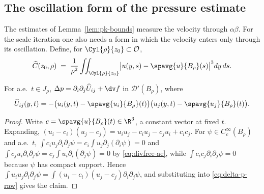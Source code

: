 \documentclass[11pt,reqno]{amsart}
\begin{document}
\subsection{The oscillation form of the pressure estimate}\label{ss:lin34}

The estimates of Lemma~\ref{lem:pk-bounds} measure the velocity through
$\alpha\beta$. For the scale iteration one also needs a form in which the
velocity enters only through its oscillation. Define, for
$\Cyl{\rho}{z_{0}}\subset\mathcal{O}$,
\begin{equation}\label{eq:Chat}
  \widehat C(z_{0},\rho)
  \;=\;\frac1{\rho^{2}}\iint_{\Cyl{\rho}{z_{0}}}
       \bigl|u(y,s)-\spavg{u}{B_{\rho}}(s)\bigr|^{3}dy\,ds .
\end{equation}

\begin{lemma}\label{lem:delta-p-centred}
For a.e.\ $t\in J_{\rho}$, $\Delta p=\partial_{i}\partial_{j}\widehat U_{ij}+\dv f$
in $\mathcal{D}'(B_{\rho})$, where
\begin{equation}\label{eq:Uhat}
  \widehat U_{ij}(y,t)
  =-\bigl(u_{i}(y,t)-\spavg{u_{i}}{B_{\rho}}(t)\bigr)
    \bigl(u_{j}(y,t)-\spavg{u_{j}}{B_{\rho}}(t)\bigr).
\end{equation}
\end{lemma}

\begin{proof}
Write $c=\spavg{u}{B_{\rho}}(t)\in\R^{3}$, a constant vector at fixed $t$. Expanding,
$(u_{i}-c_{i})(u_{j}-c_{j})=u_{i}u_{j}-c_{i}u_{j}-c_{j}u_{i}+c_{i}c_{j}$. For
$\psi\in C_{c}^{\infty}(B_{\rho})$ and a.e.\ $t$,
$\int c_{i}u_{j}\partial_{i}\partial_{j}\psi
 =c_{i}\int u_{j}\partial_{j}(\partial_{i}\psi)=0$ and
$\int c_{j}u_{i}\partial_{i}\partial_{j}\psi
 =c_{j}\int u_{i}\partial_{i}(\partial_{j}\psi)=0$ by \eqref{eq:divfree-ae},
while $\int c_{i}c_{j}\partial_{i}\partial_{j}\psi=0$ because $\psi$ has compact
support. Hence
$\int u_{i}u_{j}\partial_{i}\partial_{j}\psi
 =\int(u_{i}-c_{i})(u_{j}-c_{j})\partial_{i}\partial_{j}\psi$, and substituting
into \eqref{eq:delta-p-raw} gives the claim.
\end{proof}
\end{document}
